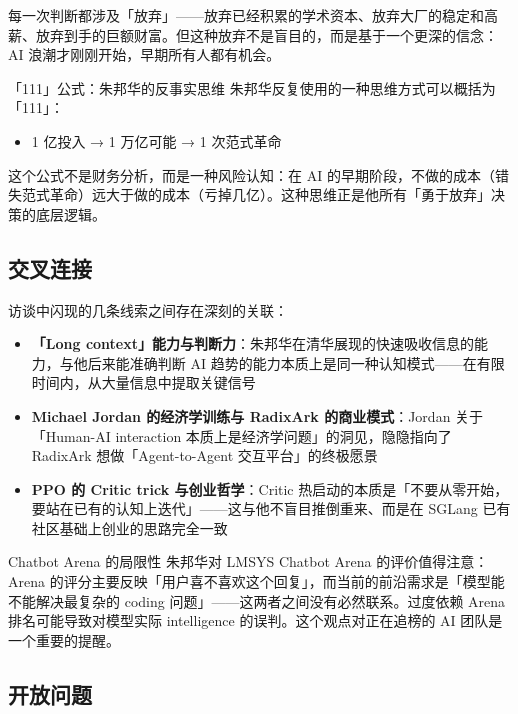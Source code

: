 \documentclass[a4paper]{article}
\begin{document}
每一次判断都涉及「放弃」——放弃已经积累的学术资本、放弃大厂的稳定和高薪、放弃到手的巨额财富。但这种放弃不是盲目的，而是基于一个更深的信念：AI 浪潮才刚刚开始，早期所有人都有机会。

\begin{importantbox}{「111」公式：朱邦华的反事实思维}
朱邦华反复使用的一种思维方式可以概括为「111」：
\begin{itemize}
\item 1 亿投入 → 1 万亿可能 → 1 次范式革命
\end{itemize}
这个公式不是财务分析，而是一种风险认知：在 AI 的早期阶段，不做的成本（错失范式革命）远大于做的成本（亏掉几亿）。这种思维正是他所有「勇于放弃」决策的底层逻辑。
\end{importantbox}

\subsection{交叉连接}

访谈中闪现的几条线索之间存在深刻的关联：

\begin{itemize}
\item \textbf{「Long context」能力与判断力}：朱邦华在清华展现的快速吸收信息的能力，与他后来能准确判断 AI 趋势的能力本质上是同一种认知模式——在有限时间内，从大量信息中提取关键信号
\item \textbf{Michael Jordan 的经济学训练与 RadixArk 的商业模式}：Jordan 关于「Human-AI interaction 本质上是经济学问题」的洞见，隐隐指向了 RadixArk 想做「Agent-to-Agent 交互平台」的终极愿景
\item \textbf{PPO 的 Critic trick 与创业哲学}：Critic 热启动的本质是「不要从零开始，要站在已有的认知上迭代」——这与他不盲目推倒重来、而是在 SGLang 已有社区基础上创业的思路完全一致
\end{itemize}

\begin{warningbox}{Chatbot Arena 的局限性}
朱邦华对 LMSYS Chatbot Arena 的评价值得注意：Arena 的评分主要反映「用户喜不喜欢这个回复」，而当前的前沿需求是「模型能不能解决最复杂的 coding 问题」——这两者之间没有必然联系。过度依赖 Arena 排名可能导致对模型实际 intelligence 的误判。这个观点对正在追榜的 AI 团队是一个重要的提醒。
\end{warningbox}

\subsection{开放问题}
\end{document}
